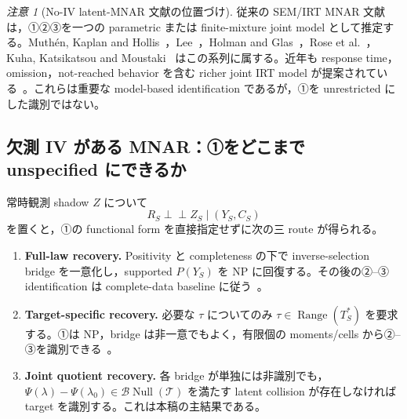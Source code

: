 \documentclass[11pt,a4paper]{ltjsarticle}
\theoremstyle{remark}
\newtheorem{remark}{注意}[section]
\newcommand{\ind}{\perp\!\!\!\perp}
\newcommand{\Top}{\mathscr T}
\newcommand{\Bop}{\mathscr B}
\newcommand{\Null}{\operatorname{Null}}
\newcommand{\Range}{\operatorname{Range}}
\begin{document}
\begin{remark}[No-IV latent-MNAR 文献の位置づけ]
従来の SEM/IRT MNAR 文献は，①②③を一つの parametric または finite-mixture joint model として推定する。Muth\'en, Kaplan and Hollis~\cite{MuthenKaplanHollis1987}，Lee~\cite{Lee2006}，Holman and Glas~\cite{HolmanGlas2005}，Rose et al.~\cite{RoseVonDavierXu2010,RoseVonDavierNagengast2017}，Kuha, Katsikatsou and Moustaki~\cite{KuhaKatsikatsouMoustaki2018} はこの系列に属する。近年も response time，omission，not-reached behavior を含む richer joint IRT model が提案されている~\cite{WuMaChen2026}。これらは重要な model-based identification であるが，①を unrestricted にした識別ではない。
\end{remark}

\subsection{欠測 IV がある MNAR：①をどこまで unspecified にできるか}

常時観測 shadow $Z$ について
\[
 R_S\ind Z_S\mid(Y_S,C_S)
\]
を置くと，①の functional form を直接指定せずに次の三 route が得られる。

\begin{enumerate}[label=\textbf{Route \Alph*.},leftmargin=26mm]
\item \textbf{Full-law recovery.} Positivity と completeness の下で inverse-selection bridge を一意化し，supported $P(Y_S)$ を NP に回復する。その後の②--③ identification は complete-data baseline に従う~\cite{dHaultfoeuille2010,MiaoTT2016,MiaoEtAl2024}。
\item \textbf{Target-specific recovery.} 必要な $\tau$ についてのみ $\tau\in\Range(T_S^*)$ を要求する。①は NP，bridge は非一意でもよく，有限個の moments/cells から②--③を識別できる~\cite{LiMiaoTT2023}。
\item \textbf{Joint quotient recovery.} 各 bridge が単独には非識別でも，$\Psi(\lambda)-\Psi(\lambda_0)\in\Bop\Null(\Top)$ を満たす latent collision が存在しなければ target を識別する。これは本稿の主結果である。
\end{enumerate}
\end{document}
